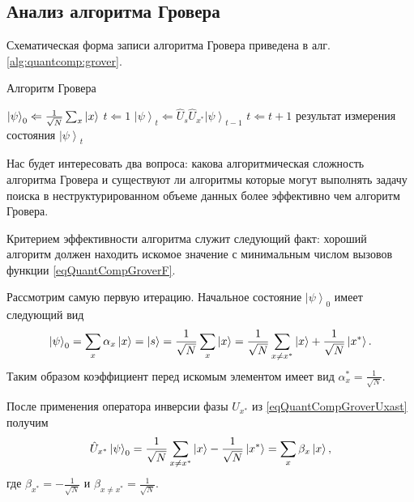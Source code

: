 \subsection{Анализ алгоритма Гровера}

Схематическая форма записи алгоритма Гровера приведена в алг.
\ref{alg:quantcomp:grover}.  
\begin{algorithm}
\caption{Алгоритм Гровера}
\label{alg:quantcomp:grover}
\begin{algorithmic}
    \STATE $\left|\psi\right>_0 \Leftarrow \frac{1}{\sqrt{N}}\sum_x 
    \ket{x}$
    \STATE $t \Leftarrow 1$
    \REPEAT
    \STATE $\left|\psi\right>_t \Leftarrow \hat{U}_s\hat{U}_{x^{\ast}}
    \left|\psi\right>_{t-1}$
    \STATE $t \Leftarrow t + 1$
    \RETURN результат измерения состояния $\left|\psi\right>_t$
\end{algorithmic}
\end{algorithm}

Нас будет интересовать два вопроса: какова алгоритмическая сложность
алгоритма Гровера и существуют ли алгоритмы которые могут выполнять
задачу поиска в неструктурированном объеме данных более эффективно чем
алгоритм Гровера.

Критерием эффективности алгоритма служит следующий факт: хороший
алгоритм должен находить искомое значение с минимальным числом вызовов
функции \eqref{eqQuantCompGroverF}.

Рассмотрим самую первую итерацию. Начальное состояние
$\left|\psi\right>_0$ имеет следующий вид
\begin{equation}
\left|\psi\right>_0 =
\sum_x \alpha_x \ket{x} =  
\ket{s} = 
\frac{1}{\sqrt{N}}\sum_x \ket{x} = 
\frac{1}{\sqrt{N}}\sum_{x\ne x^{\ast}} \ket{x} +
\frac{1}{\sqrt{N}} \left|x^{\ast}\right>.
\nonumber
\end{equation}
Таким образом коэффициент перед искомым элементом имеет вид
$\alpha_x^{\ast} = \frac{1}{\sqrt{N}}$. 

После применения оператора инверсии
фазы $U_{x^{\ast}}$ из \eqref{eqQuantCompGroverUxast} получим
\begin{equation}
\hat{U}_{x^{\ast}} \left|\psi\right>_0 =
\frac{1}{\sqrt{N}}\sum_{x\ne x^{\ast}} \ket{x} - 
\frac{1}{\sqrt{N}} \left|x^{\ast}\right> = \sum_x \beta_x \ket{x},
\nonumber
\end{equation}
где $\beta_{x^\ast} = - \frac{1}{\sqrt{N}}$ и $\beta_{x \ne x^\ast} =
\frac{1}{\sqrt{N}}$. 


